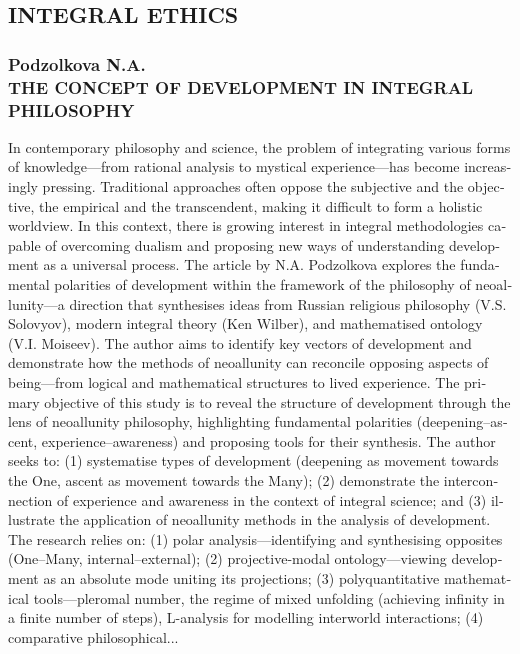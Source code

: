 \ifprintabstract
    \begin{english}
    \subsection{INTEGRAL ETHICS}
    \label{subsec:podzolkova-en}

    \subsubsection{Podzolkova N.A. \\ THE CONCEPT OF DEVELOPMENT IN INTEGRAL PHILOSOPHY}
    \label{subsubsec:podzolkova-title-en}

    In contemporary philosophy and science, the problem of integrating various forms of knowledge—from rational analysis to mystical experience—has become increasingly pressing. Traditional approaches often oppose the subjective and the objective, the empirical and the transcendent, making it difficult to form a holistic worldview. In this context, there is growing interest in integral methodologies capable of overcoming dualism and proposing new ways of understanding development as a universal process. The article by N.A. Podzolkova explores the fundamental polarities of development within the framework of the philosophy of neoallunity—a direction that synthesises ideas from Russian religious philosophy (V.S. Solovyov), modern integral theory (Ken Wilber), and mathematised ontology (V.I. Moiseev). The author aims to identify key vectors of development and demonstrate how the methods of neoallunity can reconcile opposing aspects of being—from logical and mathematical structures to lived experience. The primary objective of this study is to reveal the structure of development through the lens of neoallunity philosophy, highlighting fundamental polarities (deepening–ascent, experience–awareness) and proposing tools for their synthesis. The author seeks to: (1) systematise types of development (deepening as movement towards the One, ascent as movement towards the Many); (2) demonstrate the interconnection of experience and awareness in the context of integral science; and (3) illustrate the application of neoallunity methods in the analysis of development. The research relies on: (1) polar analysis—identifying and synthesising opposites (One–Many, internal–external); (2) projective-modal ontology—viewing development as an absolute mode uniting its projections; (3) polyquantitative mathematical tools—pleromal number, the regime of mixed unfolding (achieving infinity in a finite number of steps), L-analysis for modelling interworld interactions; (4) comparative philosophical...

\end{english}
